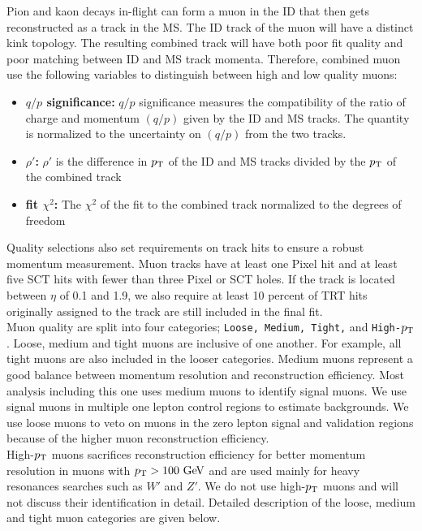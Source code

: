 \indent Pion and kaon decays in-flight can form a muon in the ID that then gets reconstructed as a track in the MS.  The ID track of the muon will have a distinct kink topology. The resulting combined track will have both poor fit quality and poor matching between ID and MS track momenta.  Therefore, combined muon use the following variables to distinguish between high and low quality muons: \\

\begin{itemize}
\item[] {\bf $q/p$ significance:} $q/p$ significance measures the compatibility of the ratio of charge and momentum $(q/p)$ given by the ID and MS tracks. The quantity is normalized to the uncertainty on $(q/p)$ from the two tracks.
\item[] {\bf $\rho\prime$:} $\rho\prime$ is the difference in $p_{\mathrm{T}}$ of the ID and MS tracks divided by the $p_{\mathrm{T}}$ of the combined track
\item[] {\bf fit $\chi^2$:} The $\chi^2$ of the fit to the combined track normalized to the degrees of freedom
\end{itemize}

\indent Quality selections also set requirements on track hits to ensure a robust momentum measurement.  Muon tracks have at least one Pixel hit and at least five SCT hits with fewer than three Pixel or SCT holes.  If the track is located between $\eta$ of 0.1 and 1.9, we also require at least 10 percent of TRT hits originally assigned to the track are still included in the final fit.  \\

\indent Muon quality are split into four categories; {\tt Loose, Medium, Tight,} and {\tt High-$p_{\mathrm{T}}$}.  Loose, medium and tight muons are inclusive of one another.  For example, all tight muons are also included in the looser categories.  Medium muons represent a good balance between momentum resolution and reconstruction efficiency.  Most analysis including this one uses medium muons to identify signal muons.  We use signal muons in multiple one lepton control regions to estimate backgrounds.  We use loose muons to veto on muons in the zero lepton signal and validation regions because of the higher muon reconstruction efficiency. \\

\indent High-$p_{\mathrm{T}}$ muons sacrifices reconstruction efficiency for better momentum resolution in muons with $\pt > 100 \gev$ and are used mainly for heavy resonances searches such as $W\prime$ and $Z\prime$.  We do not use high-$p_{\mathrm{T}}$ muons and will not discuss their identification in detail.  Detailed description of the loose, medium and tight muon categories are given below.  \\

